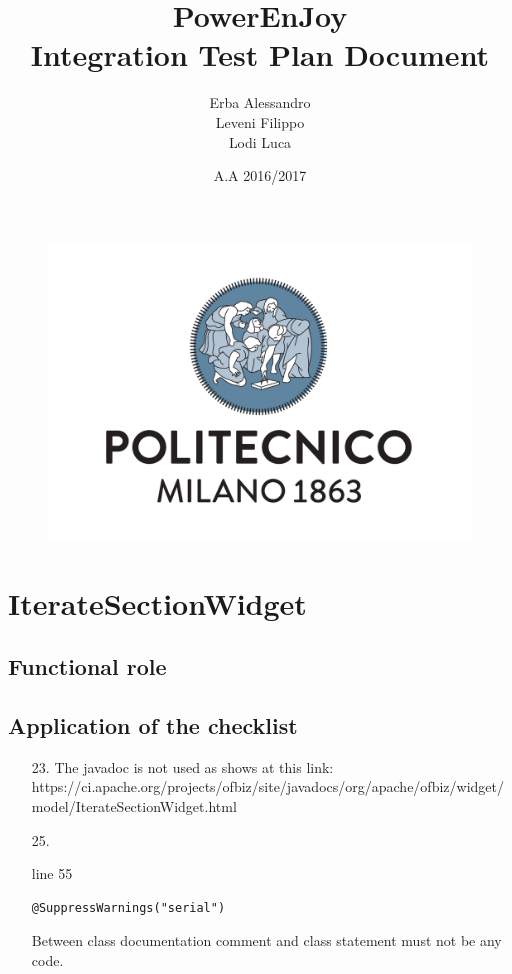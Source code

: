 \documentclass[english]{article}
\begin{document}
\lstset{language=Java} 

	\begin{figure}
		\centering
		\includegraphics[scale=0.5]{logo.pdf} 
	\end{figure}


	\title{PowerEnJoy\\
	Integration Test Plan Document\\
	}

	\date{A.A 2016/2017}
	
	\author{Erba Alessandro\\
	 Leveni Filippo\\
	 Lodi Luca}
	
	\maketitle
	\pagebreak{}
	\tableofcontents{} \pagebreak{}
	
\section{IterateSectionWidget}
	\subsection{Functional role}
	\subsection{Application of the checklist}
\begin{itemize}
	\item[23.]{The javadoc is not used as shows at this link:\\
https://ci.apache.org/projects/ofbiz/site/javadocs/org/apache/ofbiz/widget/model/IterateSectionWidget.html}
	\item[25.]{line 55
		\begin{lstlisting}
@SuppressWarnings("serial")
		\end{lstlisting}
Between class documentation comment and class statement must not be any code.
}
\end{itemize}
\end{document}

